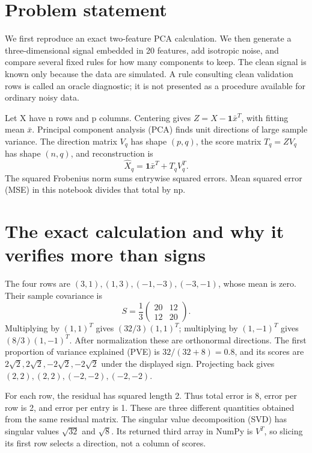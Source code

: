 

\section*{Problem statement}
We first reproduce an exact two-feature PCA calculation. We then generate a three-dimensional signal embedded in 20 features,
add isotropic noise, and compare several fixed rules for how many components to keep.
The clean signal is known only because the data are simulated. A rule consulting clean validation rows is called an oracle diagnostic;
it is not presented as a procedure available for ordinary noisy data.

Let X have n rows and p columns. Centering gives $Z=X-\mathbf1\bar x^T$, with fitting mean $\bar x$.
Principal component analysis (PCA) finds unit directions of large sample variance. The direction matrix $V_q$ has shape $(p,q)$,
the score matrix $T_q=ZV_q$ has shape $(n,q)$, and reconstruction is
\[\widehat X_q=\mathbf1\bar x^T+T_qV_q^T.\]
The squared Frobenius norm sums entrywise squared errors. Mean squared error (MSE) in this notebook divides that total by np.

\section{The exact calculation and why it verifies more than signs}
The four rows are $(3,1),(1,3),(-1,-3),(-3,-1)$, whose mean is zero.
Their sample covariance is
\[S=\frac1{3}\begin{pmatrix}20&12\\12&20\end{pmatrix}.\]
Multiplying by $(1,1)^T$ gives $(32/3)(1,1)^T$; multiplying by $(1,-1)^T$ gives $(8/3)(1,-1)^T$.
After normalization these are orthonormal directions. The first proportion of variance explained (PVE) is
$32/(32+8)=0.8$, and its scores are $2\sqrt2,2\sqrt2,-2\sqrt2,-2\sqrt2$ under the displayed sign.
Projecting back gives $(2,2),(2,2),(-2,-2),(-2,-2)$.

For each row, the residual has squared length 2. Thus total error is 8, error per row is 2,
and error per entry is 1. These are three different quantities obtained from the same residual matrix.
The singular value decomposition (SVD) has singular values $\sqrt{32}$ and $\sqrt8$.
Its returned third array in NumPy is $V^T$, so slicing its first row selects a direction, not a column of scores.

